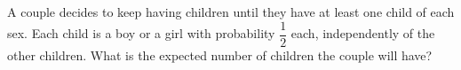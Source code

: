 A couple decides to keep having children until they have at least one child of each sex. Each child is a boy or a girl with probability $\dfrac12$ each, independently of the other children. What is the expected number of children the couple will have?
